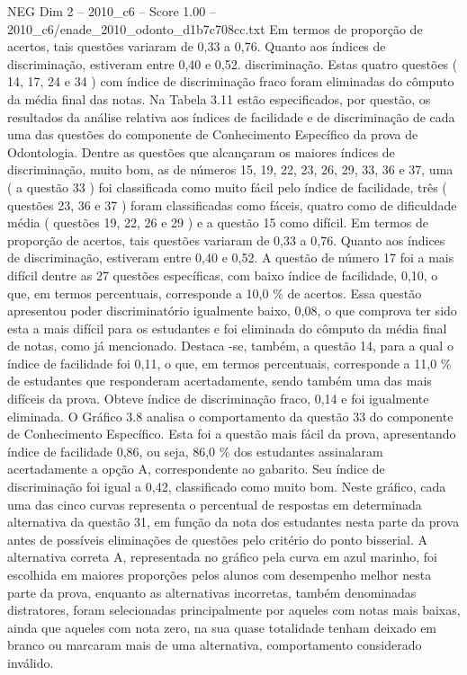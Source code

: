 \begin{textsample}{NEG Dim 2 – 2010\_c6 – Score 1.00 – 2010\_c6/enade\_2010\_odonto\_d1b7c708cc.txt}
Em termos de proporção de acertos, tais questões variaram de 0,33 a 0,76.
Quanto aos índices de discriminação, estiveram entre 0,40 e 0,52. discriminação.
Estas quatro questões ( 14, 17, 24 e 34 ) com índice de discriminação fraco foram eliminadas do cômputo da média final das notas.
Na Tabela 3.11 estão especificados, por questão, os resultados da análise relativa aos índices de facilidade e de discriminação de cada uma das questões do componente de Conhecimento Específico da prova de Odontologia.
Dentre as questões que alcançaram os maiores índices de discriminação, muito bom, as de números 15, 19, 22, 23, 26, 29, 33, 36 e 37, uma ( a questão 33 ) foi classificada como muito fácil pelo índice de facilidade, três ( questões 23, 36 e 37 ) foram classificadas como fáceis, quatro como de dificuldade média ( questões 19, 22, 26 e 29 ) e a questão 15 como difícil.
Em termos de proporção de acertos, tais questões variaram de 0,33 a 0,76.
Quanto aos índices de discriminação, estiveram entre 0,40 e 0,52.
A questão de número 17 foi a mais difícil dentre as 27 questões específicas, com baixo índice de facilidade, 0,10, o que, em termos percentuais, corresponde a 10,0 \% de acertos.
Essa questão apresentou poder discriminatório igualmente baixo, 0,08, o que comprova ter sido esta a mais difícil para os estudantes e foi eliminada do cômputo da média final de notas, como já mencionado.
Destaca -se, também, a questão 14, para a qual o índice de facilidade foi 0,11, o que, em termos percentuais, corresponde a 11,0 \% de estudantes que responderam acertadamente, sendo também uma das mais difíceis da prova.
Obteve índice de discriminação fraco, 0,14 e foi igualmente eliminada.
O Gráfico 3.8 analisa o comportamento da questão 33 do componente de Conhecimento Específico.
Esta foi a questão mais fácil da prova, apresentando índice de facilidade 0,86, ou seja, 86,0 \% dos estudantes assinalaram acertadamente a opção A, correspondente ao gabarito.
Seu índice de discriminação foi igual a 0,42, classificado como muito bom.
Neste gráfico, cada uma das cinco curvas representa o percentual de respostas em determinada alternativa da questão 31, em função da nota dos estudantes nesta parte da prova antes de possíveis eliminações de questões pelo critério do ponto bisserial.
A alternativa correta A, representada no gráfico pela curva em azul marinho, foi escolhida em maiores proporções pelos alunos com desempenho melhor nesta parte da prova, enquanto as alternativas incorretas, também denominadas distratores, foram selecionadas principalmente por aqueles com notas mais baixas, ainda que aqueles com nota zero, na sua quase totalidade tenham deixado em branco ou marcaram mais de uma alternativa, comportamento considerado inválido.

\end{textsample}
